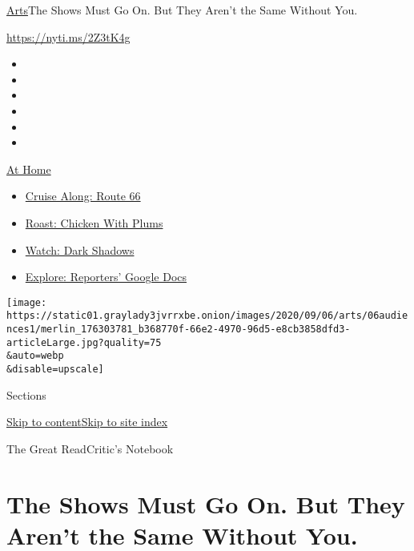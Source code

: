 \href{/section/arts}{Arts}\textbar{}The Shows Must Go On. But They
Aren't the Same Without You.

\url{https://nyti.ms/2Z3tK4g}

\begin{itemize}
\item
\item
\item
\item
\item
\item
\end{itemize}

\href{https://www.nytimes3xbfgragh.onion/spotlight/at-home?action=click\&pgtype=Article\&state=default\&region=TOP_BANNER\&context=at_home_menu}{At
Home}

\begin{itemize}
\tightlist
\item
  \href{https://www.nytimes3xbfgragh.onion/2020/09/07/travel/route-66.html?action=click\&pgtype=Article\&state=default\&region=TOP_BANNER\&context=at_home_menu}{Cruise
  Along: Route 66}
\item
  \href{https://www.nytimes3xbfgragh.onion/2020/09/04/dining/sheet-pan-chicken.html?action=click\&pgtype=Article\&state=default\&region=TOP_BANNER\&context=at_home_menu}{Roast:
  Chicken With Plums}
\item
  \href{https://www.nytimes3xbfgragh.onion/2020/09/04/arts/television/dark-shadows-stream.html?action=click\&pgtype=Article\&state=default\&region=TOP_BANNER\&context=at_home_menu}{Watch:
  Dark Shadows}
\item
  \href{https://www.nytimes3xbfgragh.onion/interactive/2020/at-home/even-more-reporters-editors-diaries-lists-recommendations.html?action=click\&pgtype=Article\&state=default\&region=TOP_BANNER\&context=at_home_menu}{Explore:
  Reporters' Google Docs}
\end{itemize}

\texttt{[image: https://static01.graylady3jvrrxbe.onion/images/2020/09/06/arts/06audiences1/merlin\_176303781\_b368770f-66e2-4970-96d5-e8cb3858dfd3-articleLarge.jpg?quality=75\\\&auto=webp\\\&disable=upscale]}

Sections

\protect\hyperlink{site-content}{Skip to
content}\protect\hyperlink{site-index}{Skip to site index}

The Great ReadCritic's Notebook

\hypertarget{the-shows-must-go-on-but-they-arent-the-same-without-you}{%
\section{The Shows Must Go On. But They Aren't the Same Without
You.}\label{the-shows-must-go-on-but-they-arent-the-same-without-you}}

